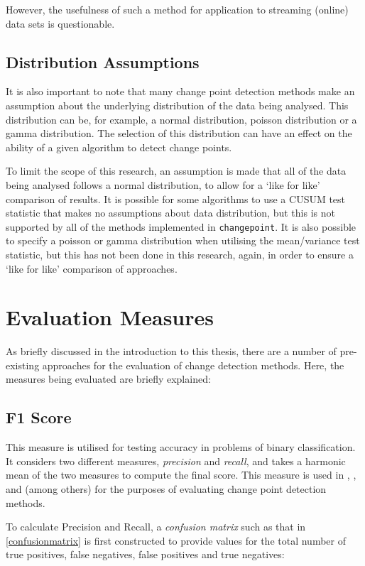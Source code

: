 \documentclass{uvamscse}	%
\begin{document}
However, the usefulness of such a method for application to streaming (online) data sets is questionable.


\subsection{Distribution Assumptions}

It is also important to note that many change point detection methods make an assumption about the underlying distribution of the data being analysed. This distribution can be, for example, a normal distribution, poisson distribution or a gamma distribution. The selection of this distribution can have an effect on the ability of a given algorithm to detect change points.

To limit the scope of this research, an assumption is made that all of the data being analysed follows a normal distribution, to allow for a `like for like' comparison of results. It is possible for some algorithms to use a CUSUM test statistic that makes no assumptions about data distribution, but this is not supported by all of the methods implemented in \texttt{changepoint}. It is also possible to specify a poisson or gamma distribution when utilising the mean/variance test statistic, but this has not been done in this research, again, in order to ensure a `like for like' comparison of approaches.

\section{Evaluation Measures}

As briefly discussed in the introduction to this thesis, there are a number of pre-existing approaches for the evaluation of change detection methods. Here, the measures being evaluated are briefly explained:

\subsection{F1 Score}

This measure is utilised for testing accuracy in problems of binary classification. It considers two different measures, \emph{precision} and \emph{recall}, and takes a harmonic mean of the two measures to compute the final score. This measure is used in \cite{Qahtan2015}, \cite{Buntain2014}, and \cite{Pelecanos2010} (among others) for the purposes of evaluating change point detection methods.
	
	To calculate Precision and Recall, a \emph{confusion matrix} such as that in \autoref{confusionmatrix} is first constructed to provide values for the total number of true positives, false negatives, false positives and true negatives:
	
\end{document}
